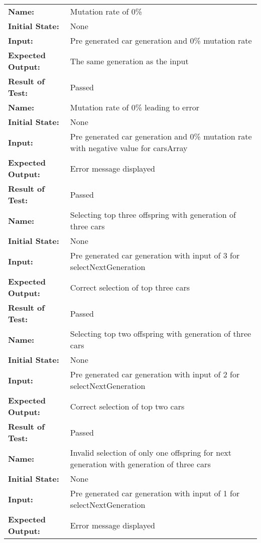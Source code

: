 \documentclass[12pt, titlepage]{article}
\begin{document}
\begin{center}
\begin{longtable}{ l | p{10cm} }
\hline
\rule{0pt}{1.5em}\textbf{Name:} & Mutation rate of 0\%\\
\textbf{Initial State:} & None\\
\textbf{Input:} & Pre generated car generation and 0\% mutation rate\\
\textbf{Expected Output:} & The same generation as the input\\[0.6em]
\textbf{Result of Test:} & Passed\\
\hline
\rule{0pt}{1.5em}\textbf{Name:} & Mutation rate of 0\% leading to error\\
\textbf{Initial State:} & None\\
\textbf{Input:} & Pre generated car generation and 0\% mutation rate with 
negative value for carsArray\\
\textbf{Expected Output:} & Error message displayed\\[0.6em]
\textbf{Result of Test:} & Passed\\
\hline
\rule{0pt}{1.5em}\textbf{Name:} & Selecting top three offspring with generation 
of three cars\\
\textbf{Initial State:} & None\\
\textbf{Input:} & Pre generated car generation with input of 3 for 
selectNextGeneration\\
\textbf{Expected Output:} & Correct selection of top three cars\\[0.6em]
\textbf{Result of Test:} & Passed\\
\hline
\rule{0pt}{1.5em}\textbf{Name:} & Selecting top two offspring with generation of 
three cars\\
\textbf{Initial State:} & None\\
\textbf{Input:} & Pre generated car generation with input of 2 for 
selectNextGeneration\\
\textbf{Expected Output:} & Correct selection of top two cars\\[0.6em]
\textbf{Result of Test:} & Passed\\
\hline
\rule{0pt}{1.5em}\textbf{Name:} & Invalid selection of only one offspring for 
next generation with generation of three cars\\
\textbf{Initial State:} & None\\
\textbf{Input:} & Pre generated car generation with input of 1 for 
selectNextGeneration\\
\textbf{Expected Output:} & Error message displayed\\[0.6em]

\end{longtable}
\end{center}
\end{document}
